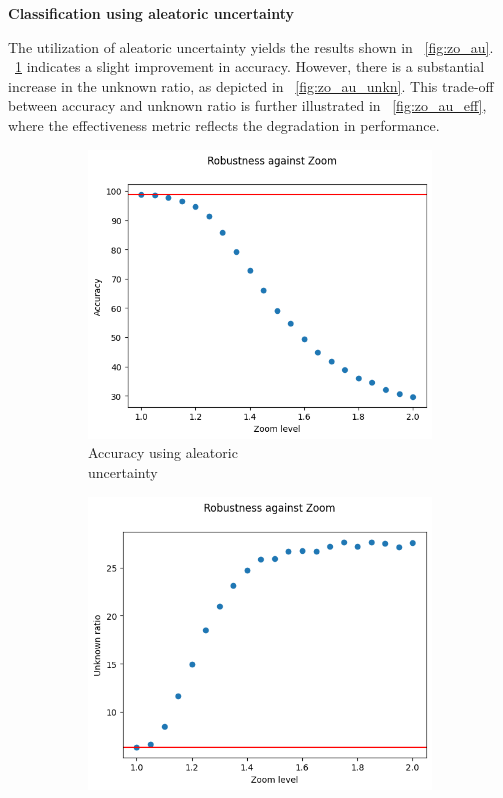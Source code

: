 \vspace{0.3cm}
\textbf{Classification using aleatoric uncertainty}
\vspace{0.1cm}

The utilization of aleatoric uncertainty yields the results shown in \Fig~\ref{fig:zo_au}. \Fig~\ref{fig:zo_au_acc} indicates a slight improvement in accuracy. However, there is a substantial increase in the unknown ratio, as depicted in \Fig~\ref{fig:zo_au_unkn}. This trade-off between accuracy and unknown ratio is further illustrated in \Fig~\ref{fig:zo_au_eff}, where the effectiveness metric reflects the degradation in performance.

\begin{figure}[h]
	\centering
	\begin{subfigure}{.33\textwidth}
		\centering
		\includegraphics[width=0.9\linewidth]{ImageFiles/EvalBNN/ZO/AU/acc}
		\caption{Accuracy using aleatoric \\ uncertainty}
		\label{fig:zo_au_acc}
	\end{subfigure}%
	\begin{subfigure}{.33\textwidth}
		\centering
		\includegraphics[width=0.9\linewidth]{ImageFiles/EvalBNN/ZO/AU/unkn}

\end{subfigure}
\end{figure}
